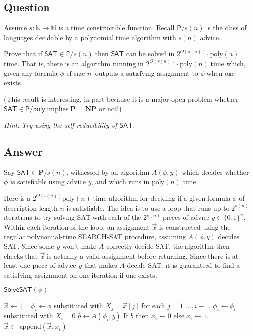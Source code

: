 \documentclass{article}
\renewcommand{\P}{\mathbf{P}}
\newcommand{\NP}{\mathbf{NP}}
\def \N {{\mathbb N}}
\def \poly{\text{poly}}
\begin{document}
\subsection*{Question}
Assume $s : \N \rightarrow \N$ is a time constructible function. Recall $\mathsf{P}/s(n)$ is the class of languages decidable by a polynomial time algorithm with $s(n)$ advice. 

Prove that if $\textsf{SAT} \in \mathsf{P}/s(n)$ then $\textsf{SAT}$ can be solved in $2^{O(s(n))}\cdot \poly(n)$ time. That is, there is an algorithm running in $2^{O(s(n))}\cdot \poly(n)$ time which, given any formula $\phi$ of size $n$, outputs a satisfying assignment to $\phi$ when one exists.

(This result is interesting, in part because it is a major open problem whether $\textsf{SAT} \in \mathsf{P}/\mathsf{poly}$ implies $\P = \NP$ or not!)

\emph{Hint: Try using the self-reducibility of $\mathsf{SAT}$.}

\subsection*{Answer}

Say $\textsf{SAT} \in \P/s(n)$, witnessed by an algorithm $A(\phi, y)$ which decides whether $\phi$ is satisfiable using advice $y$, and which runs in $\poly(n)$ time.

Here is a $2^{O(s(n))} \poly(n)$ time algorithm for deciding if a given formula $\phi$ of description length $n$ is satisfiable.
The idea is to use a loop that runs up to $2^{s(n)}$ iterations to try solving SAT with each of the $2^{s(n)}$ pieces of advice $y \in \{0, 1\}^n$.
Within each iteration of the loop, an assignment $\vec{x}$ is constructed using the regular polynomial-time SEARCH-SAT procedure, assuming $A(\phi, y)$ decides SAT.
Since some $y$ won't make $A$ correctly decide SAT, the algorithm then checks that $\vec{x}$ is actually a valid assignment before returning.
Since there is at least one piece of advice $y$ that makes $A$ decide SAT, it is guaranteed to find a satisfying assignment on one iteration if one exists.

\begin{algorithm}{$\mathsf{SolveSAT}(\phi)$}
\begin{algorithmic}[1]
		\STATE $\vec{x} \gets []$
			\STATE $\phi_i \gets \phi$ substituted with $X_j = \vec{x}[j]$ for each $j= 1, \dots, i-1$.
			\STATE $\phi_i \gets \phi_i$ substituted with $X_i = 0$
			\STATE $b \gets A(\phi_i, y)$
			\STATE If $b$ then $x_i \gets 0$ else $x_i \gets 1$.
			\STATE $\vec{x} \gets \text{append}(\vec{x}, x_i)$
		\ENDFOR
			 
		\ENDIF
	\ENDFOR
\end{algorithmic}
\end{algorithm}
\end{document}
